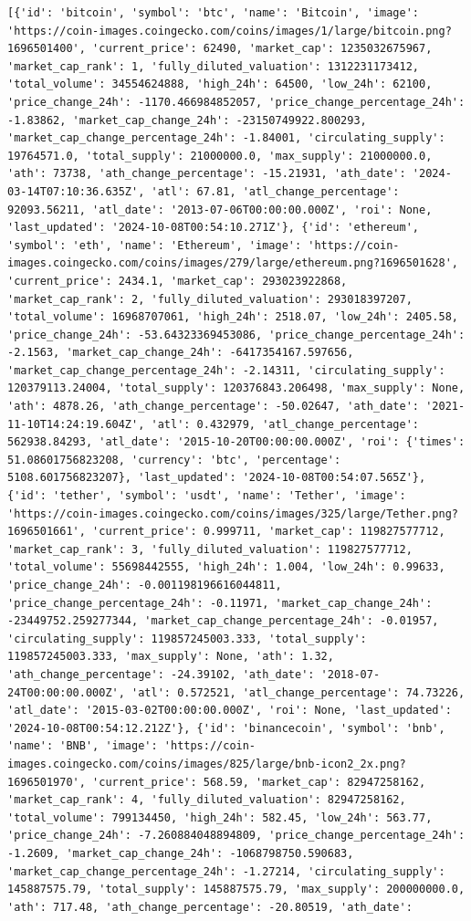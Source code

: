 \documentclass[
  letterpaper,
  DIV=11,
  numbers=noendperiod]{scrreprt}
\begin{document}
\begin{verbatim}
[{'id': 'bitcoin', 'symbol': 'btc', 'name': 'Bitcoin', 'image': 'https://coin-images.coingecko.com/coins/images/1/large/bitcoin.png?1696501400', 'current_price': 62490, 'market_cap': 1235032675967, 'market_cap_rank': 1, 'fully_diluted_valuation': 1312231173412, 'total_volume': 34554624888, 'high_24h': 64500, 'low_24h': 62100, 'price_change_24h': -1170.466984852057, 'price_change_percentage_24h': -1.83862, 'market_cap_change_24h': -23150749922.800293, 'market_cap_change_percentage_24h': -1.84001, 'circulating_supply': 19764571.0, 'total_supply': 21000000.0, 'max_supply': 21000000.0, 'ath': 73738, 'ath_change_percentage': -15.21931, 'ath_date': '2024-03-14T07:10:36.635Z', 'atl': 67.81, 'atl_change_percentage': 92093.56211, 'atl_date': '2013-07-06T00:00:00.000Z', 'roi': None, 'last_updated': '2024-10-08T00:54:10.271Z'}, {'id': 'ethereum', 'symbol': 'eth', 'name': 'Ethereum', 'image': 'https://coin-images.coingecko.com/coins/images/279/large/ethereum.png?1696501628', 'current_price': 2434.1, 'market_cap': 293023922868, 'market_cap_rank': 2, 'fully_diluted_valuation': 293018397207, 'total_volume': 16968707061, 'high_24h': 2518.07, 'low_24h': 2405.58, 'price_change_24h': -53.64323369453086, 'price_change_percentage_24h': -2.1563, 'market_cap_change_24h': -6417354167.597656, 'market_cap_change_percentage_24h': -2.14311, 'circulating_supply': 120379113.24004, 'total_supply': 120376843.206498, 'max_supply': None, 'ath': 4878.26, 'ath_change_percentage': -50.02647, 'ath_date': '2021-11-10T14:24:19.604Z', 'atl': 0.432979, 'atl_change_percentage': 562938.84293, 'atl_date': '2015-10-20T00:00:00.000Z', 'roi': {'times': 51.08601756823208, 'currency': 'btc', 'percentage': 5108.601756823207}, 'last_updated': '2024-10-08T00:54:07.565Z'}, {'id': 'tether', 'symbol': 'usdt', 'name': 'Tether', 'image': 'https://coin-images.coingecko.com/coins/images/325/large/Tether.png?1696501661', 'current_price': 0.999711, 'market_cap': 119827577712, 'market_cap_rank': 3, 'fully_diluted_valuation': 119827577712, 'total_volume': 55698442555, 'high_24h': 1.004, 'low_24h': 0.99633, 'price_change_24h': -0.001198196616044811, 'price_change_percentage_24h': -0.11971, 'market_cap_change_24h': -23449752.259277344, 'market_cap_change_percentage_24h': -0.01957, 'circulating_supply': 119857245003.333, 'total_supply': 119857245003.333, 'max_supply': None, 'ath': 1.32, 'ath_change_percentage': -24.39102, 'ath_date': '2018-07-24T00:00:00.000Z', 'atl': 0.572521, 'atl_change_percentage': 74.73226, 'atl_date': '2015-03-02T00:00:00.000Z', 'roi': None, 'last_updated': '2024-10-08T00:54:12.212Z'}, {'id': 'binancecoin', 'symbol': 'bnb', 'name': 'BNB', 'image': 'https://coin-images.coingecko.com/coins/images/825/large/bnb-icon2_2x.png?1696501970', 'current_price': 568.59, 'market_cap': 82947258162, 'market_cap_rank': 4, 'fully_diluted_valuation': 82947258162, 'total_volume': 799134450, 'high_24h': 582.45, 'low_24h': 563.77, 'price_change_24h': -7.260884048894809, 'price_change_percentage_24h': -1.2609, 'market_cap_change_24h': -1068798750.590683, 'market_cap_change_percentage_24h': -1.27214, 'circulating_supply': 145887575.79, 'total_supply': 145887575.79, 'max_supply': 200000000.0, 'ath': 717.48, 'ath_change_percentage': -20.80519, 'ath_date': 
\end{verbatim}
\end{document}
